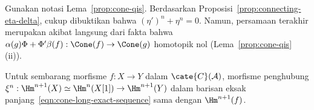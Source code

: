 \begin{bukti}
	Gunakan notasi Lema~\ref{prop:cone-qis}. Berdasarkan
	Proposisi~\ref{prop:connecting-eta-delta}, cukup dibuktikan bahwa
	$(\eta')^n+\eta^n=0$. Namun, persamaan terakhir merupakan akibat
	langsung dari fakta bahwa
	$\alpha(g)\Phi+\Phi'\beta(f):\Cone(f)\to\Cone(g)$ homotopik nol
	(Lema~\ref{prop:cone-qis} (ii)).
\end{bukti}

\begin{korolari}\label{prop:cone-connecting}
	Untuk sembarang morfisme $f:X\to Y$ dalam $\cate{C}(\mathcal{A})$,
	morfisme penghubung
	$\xi^n:\Hm^{n+1}(X)\simeq\Hm^n(X[1])\to\Hm^{n+1}(Y)$ dalam barisan
	eksak panjang~\eqref{eqn:cone-long-exact-sequence} sama dengan
	$\Hm^{n+1}(f)$.
\end{korolari}


